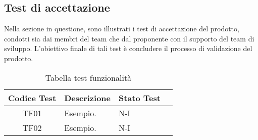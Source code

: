 \subsection{Test di accettazione}
Nella sezione in questione, sono illustrati i test di accettazione del prodotto, condotti sia dai membri del team che dal proponente con il supporto del team di sviluppo. L'obiettivo finale di tali test è concludere il processo di validazione del prodotto.
\\
\begin{table}[htbp]
    \centering
    \begin{tabular}{|c|p{3cm}|p{5cm}|c|}
        \hline
        Codice Test & Descrizione & Stato Test \\
        \hline
        TF01 & Esempio. & N-I \\
        \hline
        TF02 & Esempio. & N-I \\
        \hline
    \end{tabular}
    \caption{Tabella test funzionalità}
    \label{tab:testsAccettazione}
\end{table}



